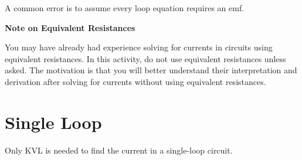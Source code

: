 \documentclass{article}
\begin{document}
A common error is to assume every loop equation requires an emf.

\textbf{Note on Equivalent Resistances}

You may have already had experience solving for currents in circuits using equivalent resistances. In this activity, do not use equivalent resistances unless asked. The motivation is that you will better understand their interpretation and derivation after solving for currents without using equivalent resistances.

\ifsolutions

\else

\newpage
\fi

\section{Single Loop}

Only KVL is needed to find the current in a single-loop circuit.
\end{document}
